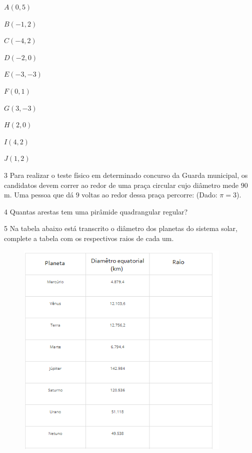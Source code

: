 \begin{escolha}
\item $A (0,5)$
\item $B (-1,2)$
\item $C (-4,2)$
\item $D (-2,0)$
\item $E (-3,-3)$
\item $F (0,1)$
\item $G (3,-3)$
\item $H (2,0)$
\item $I (4,2)$
\item $J (1,2)$
\end{escolha}



\num{3}  Para realizar o teste físico em determinado concurso da Guarda
municipal, os candidatos devem correr ao redor de uma praça circular
cujo diâmetro mede $90$ m. Uma pessoa que dá $9$ voltas ao redor dessa praça
percorre: (Dado: $π = 3$).


\num{4}  Quantas arestas tem uma pirâmide quadrangular regular?


\num{5}  Na tabela abaixo está transcrito o diâmetro dos planetas do sistema
solar, complete a tabela com os respectivos raios de cada um.

\begin{figure}
\includegraphics[width=4.05833in,height=4.13212in]{./imgSAEB_6_MAT/media/image48.png}
\end{figure}

